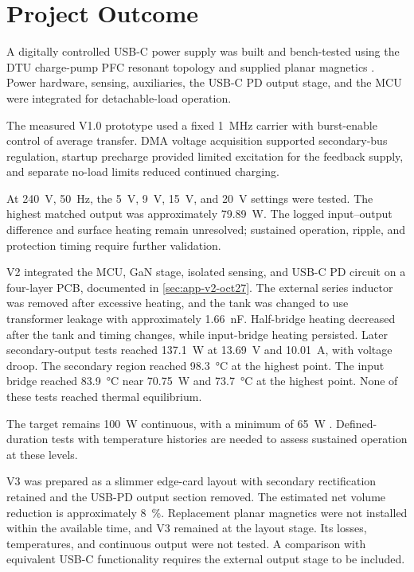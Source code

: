 \section{Project Outcome}
\label{sec:concl-summary}

A digitally controlled USB-C power supply was built and bench-tested
using the DTU charge-pump PFC resonant topology and supplied
planar magnetics \cite{ammar2020chargepump,ammar2021led}. Power hardware,
sensing, auxiliaries, the USB-C PD output stage, and the MCU were integrated
for detachable-load operation.

The measured V1.0 prototype used a fixed \SI{1}{\mega\hertz} carrier
with burst-enable control of average transfer. DMA voltage acquisition
supported secondary-bus regulation, startup precharge provided limited excitation for the feedback supply,
and separate no-load limits reduced continued charging.

At \SI{240}{\volt}, \SI{50}{\hertz}, the
\SI{5}{\volt}, \SI{9}{\volt}, \SI{15}{\volt}, and \SI{20}{\volt}
settings were tested. The highest matched output was approximately
\SI{79.89}{\watt}. The logged input--output difference and surface heating
remain unresolved; sustained operation, ripple, and protection timing
require further validation.

V2 integrated the MCU, GaN stage, isolated sensing, and USB-C PD
circuit on a four-layer PCB, documented in \cref{sec:app-v2-oct27}.
The external series inductor was removed after excessive heating, and the
tank was changed to use transformer leakage with approximately
\SI{1.66}{\nano\farad}. Half-bridge heating decreased after the tank and
timing changes, while input-bridge heating persisted. Later secondary-output tests reached \SI{137.1}{\watt} at \SI{13.69}{\volt} and \SI{10.01}{\ampere}, with voltage droop. The secondary region reached \SI{98.3}{\celsius} at the highest point. The input bridge reached \SI{83.9}{\celsius} near \SI{70.75}{\watt} and \SI{73.7}{\celsius} at the highest point. None of these tests reached thermal equilibrium.

The target remains \SI{100}{\watt} continuous, with a minimum of
\SI{65}{\watt} \cite{projectOctoberPlan}. Defined-duration tests with
temperature histories are needed to assess sustained operation at these
levels.

V3 was prepared as a slimmer edge-card layout with secondary rectification
retained and the USB-PD output section removed. The estimated net volume
reduction is approximately \SI{8}{\percent}. Replacement planar magnetics
were not installed within the available time, and V3 remained at the layout
stage. Its losses, temperatures, and continuous output were not tested. A
comparison with equivalent USB-C functionality requires the external output
stage to be included.
